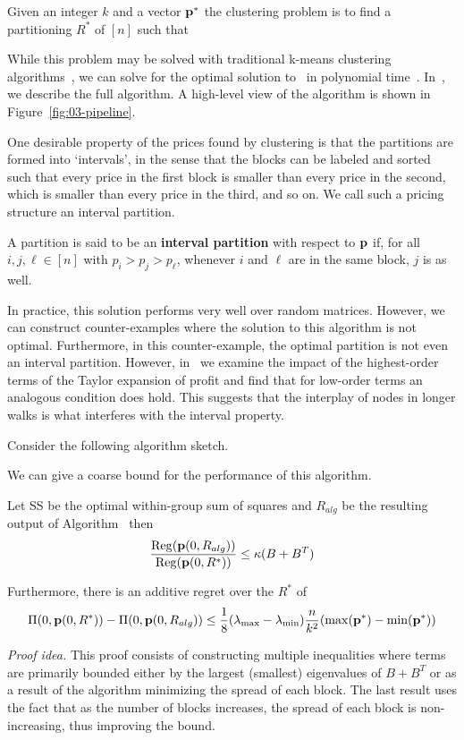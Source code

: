 \begin{definition}
    Given an integer $k$ and a vector $\mathbf{p}^*$ the clustering problem is to find a partitioning $R^*$ of  $[n]$ such that 
\end{definition}

While this problem may be solved with traditional k-means clustering algorithms~\cite{}, we can solve for the optimal solution to~\cite{} in polynomial time~\cite{}. In~\cite{}, we describe the full algorithm. A high-level view of the algorithm is shown in Figure~\ref{fig:03-pipeline}.

One desirable property of the prices found by clustering is that the partitions are formed into `intervals', in the sense that the blocks can be labeled and sorted such that every price in the first block is smaller than every price in the second, which is smaller than every price in the third, and so on. We call such a pricing structure an interval partition.
\begin{definition}
    A partition is said to be an \textbf{interval partition} with respect to $\mathbf{p}$ if, for all $i,j,\ell \in [n]$ with $p_i > p_j > p_\ell$, whenever $i$ and $\ell$ are in the same block, $j$ is as well.
\end{definition}
In practice, this solution performs very well over random matrices. However, we can construct counter-examples where the solution to this algorithm is not optimal. Furthermore, in this counter-example, the optimal partition is not even an interval partition. However, in~\cite{} we examine the impact of the highest-order terms of the Taylor expansion of profit and find that for low-order terms an analogous condition does hold. This suggests that the interplay of nodes in longer walks is what interferes with the interval property.


\begin{figure}
    \centering
    \resizebox{\textwidth}{!}{
        
    }
\end{figure}\label{fig:03-pipeline} 


Consider the following algorithm sketch. 

We can give a coarse bound for the performance of this algorithm. 
\begin{theorem}
    Let SS be the optimal within-group sum of squares and $R_{alg}$ be the resulting output of Algorithm~\cite{} then 
    \[ \frac{\mathrm{Reg}(\mathbf{p}(0,R_{alg}))}{ \mathrm{Reg}(\mathbf{p}(0,R^*))} \leq \kappa(B+B^T) \]

    Furthermore, there is an additive regret over the $R^*$ of
    \[ \Pi(0, \mathbf{p}(0,R^*)) - \Pi(0, \mathbf{p}(0,R_{alg})) \leq \frac{1}{8} (\lambda_{\max} - \lambda_{\min} ) \frac{n}{k^2} ( \max(\mathbf{p}^* ) - \min(\mathbf{p^*})) \] 
\end{theorem}
\textit{Proof idea.} This proof consists of constructing multiple inequalities where terms are primarily bounded either by the largest (smallest) eigenvalues of $B+B^T$ or as a result of the algorithm minimizing the spread of each block. The last result uses the fact that as the number of blocks increases, the spread of each block is non-increasing, thus improving the bound.


